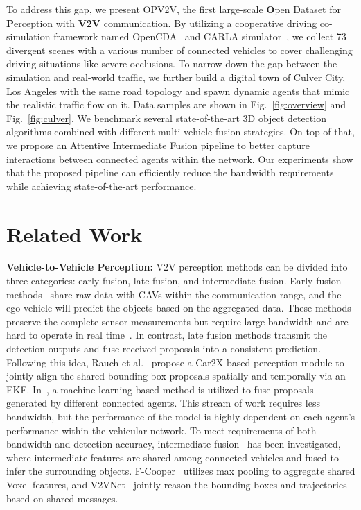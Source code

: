 \documentclass[letterpaper, 10 pt, conference]{ieeeconf}  %
\makeatletter
\newcommand{\etal}{{et al}.\@ }
\makeatother
\begin{document}
To address this gap, we present OPV2V, the first large-scale \textbf{O}pen Dataset for \textbf{P}erception with \textbf{V2V} communication. By utilizing a cooperative driving co-simulation framework named OpenCDA~\cite{xu2021opencda} and CARLA simulator~\cite{Dosovitskiy17}, we collect 73 divergent scenes with a various number of connected vehicles to cover challenging driving situations like severe occlusions. To narrow down the gap between the simulation and real-world traffic, we further build a digital town of Culver City, Los Angeles with the same road topology and spawn dynamic agents that mimic the realistic traffic flow on it.  Data samples are shown in Fig.~\ref{fig:overview} and Fig.~\ref{fig:culver}. We benchmark several state-of-the-art 3D object detection algorithms combined with different multi-vehicle fusion strategies. On top of that, we propose an Attentive Intermediate Fusion pipeline to better capture interactions between connected agents within the network. Our experiments show that the proposed pipeline can efficiently reduce the bandwidth requirements while achieving state-of-the-art performance.

\section{Related Work}
\noindent\textbf{Vehicle-to-Vehicle Perception: }V2V perception methods can be divided into three categories: early fusion, late fusion, and intermediate fusion. Early fusion methods~\cite{cooper} share raw data with CAVs within the communication range, and the ego vehicle will predict the objects based on the aggregated data. These methods preserve the complete sensor measurements but require large bandwidth and are hard to operate in real time~\cite{Wang2020V2VNetVC}. In contrast, late fusion methods transmit the detection outputs and fuse received proposals into a consistent prediction. Following this idea, Rauch \etal~\cite{Rauch2012} propose a Car2X-based perception module to jointly align the shared bounding box proposals spatially and temporally via an EKF. In~\cite{Rawashdeh2018}, a machine learning-based method is utilized to fuse proposals generated by different connected agents. This stream of work requires less bandwidth, but the performance of the model is highly dependent on each agent's performance within the vehicular network. To meet requirements of both bandwidth and detection accuracy, intermediate fusion~\cite{f-cooper, Wang2020V2VNetVC} has been investigated, where intermediate features are shared among connected vehicles and fused to infer the surrounding objects. F-Cooper~\cite{f-cooper} utilizes max pooling to aggregate shared Voxel features, and V2VNet~\cite{Wang2020V2VNetVC} jointly reason the bounding boxes and trajectories based on shared messages. 
\end{document}
